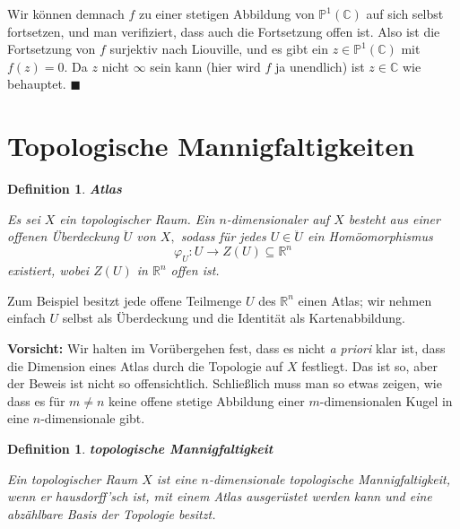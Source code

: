 \documentclass[12pt]{scrbook}   %
\newtheorem{definiX}[alles]{Definition}
\newenvironment{defini}[1]{\begin{definiX}{\bf #1}\par\rm}{\end{definiX}}
\begin{document}
Wir können demnach $f$ zu einer stetigen Abbildung von 
$\mathbb P^1(\mathbb C)$ auf sich selbst fortsetzen, und man verifiziert, dass
auch die Fortsetzung offen ist. Also ist die Fortsetzung von $f$ surjektiv nach
Liouville, und es gibt ein $z\in\mathbb P^1(\mathbb C)$ mit $f(z) = 0.$
Da $z$ nicht $\infty$ sein kann (hier wird $f$ ja unendlich) ist $z\in 
\mathbb C$ wie behauptet. 
\phantom{Anfang}\hfill{$\blacksquare$}

\section{Topologische Mannigfaltigkeiten}

\begin{defini} {\bf Atlas}

{\rm Es sei $X$ ein topologischer Raum. Ein $n$-dimensionaler 
 auf $X$ 
besteht aus einer offenen Überdeckung $\ddot U$ von $X,$ sodass für jedes 
$U\in \ddot U$ ein Homöomorphismus 
$$\varphi_U: U \longrightarrow Z(U)\subseteq \mathbb R^n$$
existiert, wobei $Z(U)$ in $\mathbb R^n$ offen ist.}

\end{defini}

Zum Beispiel besitzt jede offene Teilmenge $U$ des $\mathbb R^n$ einen Atlas; 
wir nehmen einfach $U$ selbst als Überdeckung und die Identität als
Kartenabbildung. 

{\bf Vorsicht:} Wir halten im Vorübergehen fest, dass es nicht {\it a
priori} klar ist, dass die Dimension eines Atlas durch die Topologie auf $X$
festliegt. Das ist so, aber der Beweis ist nicht so offensichtlich.
Schließlich muss man so etwas zeigen, wie dass es für $m\neq n$ keine 
offene stetige Abbildung einer $m$-dimensionalen Kugel in eine 
$n$-dimensionale gibt.

\begin{defini} {\bf topologische Mannigfaltigkeit}

{\rm Ein topologischer Raum $X$ ist eine $n$-dimensionale {\it topologische
Mannigfaltigkeit}, wenn er hausdorff'sch
ist, mit einem Atlas
ausgerüstet werden kann und eine abzählbare Basis der Topologie besitzt.
}

\end{defini}
\end{document}
